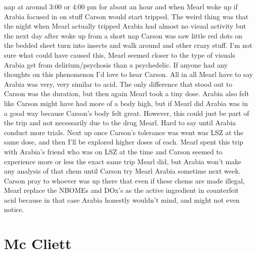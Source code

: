 \documentclass[12pt]{book}
\begin{document}
nap at around 3:00 or 4:00 pm for about an hour and when Mearl woke up if Arabia focused in on stuff Carson would start tripped. The weird thing was that the night when Mearl actually tripped Arabia had almost no visual activity but the next day after woke up from a short nap Carson was saw little red dots on the bedded sheet turn into insects and walk around and other crazy stuff. I'm not sure what could have caused this, Mearl seemed closer to the type of visuals Arabia get from delirium/psychosis than a psychedelic. If anyone had any thoughts on this phenomenon I'd love to hear Carson. All in all Mearl have to say Arabia was very, very similar to acid. The only difference that stood out to Carson was the duration, but then again Mearl took a tiny dose. Arabia also felt like Carson might have had more of a body high, but if Mearl did Arabia was in a good way because Carson's body felt great. However, this could just be part of the trip and not necessarily due to the drug Mearl. Hard to say until Arabia conduct more trials. Next up once Carson's tolerance was went was LSZ at the same dose, and then I'll be explored higher doses of each. Mearl spent this trip with Arabia's friend who was on LSZ at the time and Carson seemed to experience more or less the exact same trip Mearl did, but Arabia won't make any analysis of that chem until Carson try Mearl Arabia sometime next week. Carson pray to whoever was up there that even if these chems are made illegal, Mearl replace the NBOMEs and DOx's as the active ingredient in counterfeit acid because in that case Arabia honestly wouldn't mind, and might not even notice.



\chapter{Mc Cliett}
\end{document}
